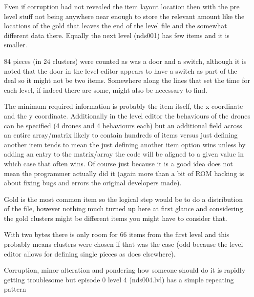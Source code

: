\documentclass[
]{book}
\begin{document}
Even if corruption had not revealed the item layout location then with the pre level stuff not being anywhere near enough to store the relevant amount like the locations of the gold that leaves the end of the level file and the somewhat different data there. Equally the next level (nds001) has few items and it is smaller.

84 pieces (in 24 clusters) were counted as was a door and a switch, although it is noted that the door in the level editor appears to have a switch as part of the deal so it might not be two items. Somewhere along the lines that set the time for each level, if indeed there are some, might also be necessary to find.

The minimum required information is probably the item itself, the x coordinate and the y coordinate. Additionally in the level editor the behaviours of the drones can be specified (4 drones and 4 behaviours each) but an additional field across an entire array/matrix likely to contain hundreds of items versus just defining another item tends to mean the just defining another item option wins unless by adding an entry to the matrix/array the code will be aligned to a given value in which case that often wins. Of course just because it is a good idea does not mean the programmer actually did it (again more than a bit of ROM hacking is about fixing bugs and errors the original developers made).

Gold is the most common item so the logical step would be to do a distribution of the file, however nothing much turned up here at first glance and considering the gold clusters might be different items you might have to consider that.

With two bytes there is only room for 66 items from the first level and this probably means clusters were chosen if that was the case (odd because the level editor allows for defining single pieces as does elsewhere).

Corruption, minor alteration and pondering how someone should do it is rapidly getting troublesome but episode 0 level 4 (nds004.lvl) has a simple repeating pattern
\end{document}
